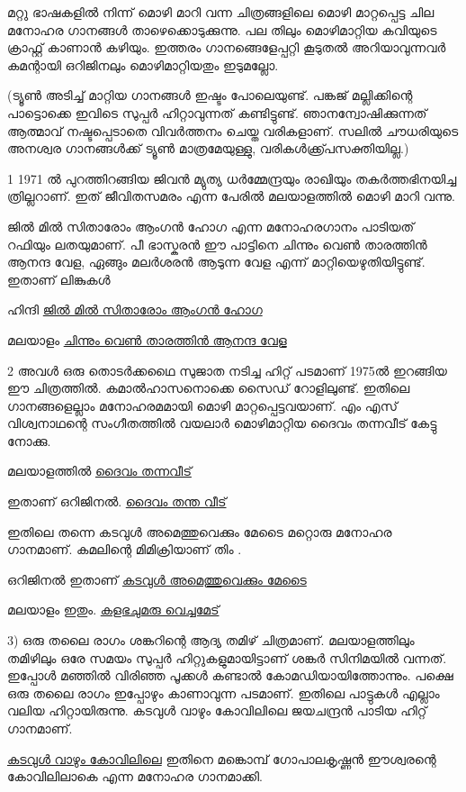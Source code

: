 \documentclass[10pt,a4paper]{report}
\begin{document}
മറ്റു ഭാഷകളിൽ നിന്ന് മൊഴി മാറി വന്ന ചിത്രങ്ങളിലെ മൊഴി മാറ്റപ്പെട്ട ചില മനോഹര ഗാനങ്ങൾ താഴെക്കൊടുക്കുന്നു. പല തിലും മൊഴിമാറ്റിയ കവിയുടെ ക്രാഫ്റ്റ് കാണാൻ കഴിയും. ഇത്തരം ഗാനങ്ങെളേപ്പറ്റി കൂടുതൽ അറിയാവുന്നവർ കമന്റായി ഒറിജിനലും മൊഴിമാറ്റിയതും ഇടുമല്ലോ.

(ട്യൂൺ അടിച്ച് മാറ്റിയ ഗാനങ്ങൾ ഇഷ്ടം പോലെയുണ്ട്. പങ്കജ് മല്ലിക്കിന്റെ പാട്ടൊക്കെ ഇവിടെ സുപ്പർ ഹിറ്റാവുന്നത് കണ്ടിട്ടുണ്ട്. ഞാനന്വോഷിക്കുന്നത് ആത്മാവ് നഷ്ടപ്പെടാതെ വിവർത്തനം ചെയ്ത വരികളാണ്. സലിൽ ചൗധരിയുടെ അനശ്വര ഗാനങ്ങൾക്ക് ട്യൂൺ മാത്രമേയുള്ളു, വരികൾക്ക്പ്രസക്തിയില്ല.)

1 1971 ൽ പുറത്തിറങ്ങിയ ജിവൻ മ്യുത്യ ധർമ്മേന്ദ്രയും രാഖിയും തകർത്തഭിനയിച്ച ത്രില്ലറാണ്. ഇത് ജീവിതസമരം എന്ന പേരിൽ മലയാളത്തിൽ മൊഴി മാറി വന്നു.

ജിൽ മിൽ സിതാരോം ആംഗൻ ഹോഗ എന്ന മനോഹരഗാനം പാടിയത് റഫിയും ലതയുമാണ്. പീ ഭാസ്കരൻ ഈ പാട്ടിനെ ചിന്നും വെൺ താരത്തിൻ ആനന്ദ വേള, ഏങ്ങും മലർശരൻ ആടുന്ന വേള എന്ന് മാറ്റിയെഴുതിയിട്ടുണ്ട്.
ഇതാണ് ലിങ്കുകൾ

ഹിന്ദി
\href{https://youtu.be/uex2GnRrqFU}{ജിൽ മിൽ സിതാരോം ആംഗൻ ഹോഗ }

മലയാളം
\href{https://youtu.be/JfDN6qEHvY8}{ചിന്നും വെൺ താരത്തിൻ ആനന്ദ വേള}

2 അവൾ ഒരു തൊടർക്കഥൈ സുജാത നടിച്ച ഹിറ്റ് പടമാണ് 1975ൽ ഇറങ്ങിയ ഈ ചിത്രത്തിൽ. കമാൽഹാസനൊക്കെ സൈഡ് റോളിലുണ്ട്. ഇതിലെ ഗാനങ്ങളെല്ലാം മനോഹരമമായി മൊഴി മാറ്റപ്പെട്ടവയാണ്.
എം എസ് വിശ്വനാഥന്റെ സംഗീതത്തിൽ വയലാർ മൊഴിമാറ്റിയ ദൈവം തന്നവീട് കേട്ടു നോക്കു.

മലയാളത്തിൽ  \href{https://youtu.be/dxcIZVxxyi4}{ദൈവം തന്നവീട്}

ഇതാണ് ഒറിജിനൽ.
\href{https://youtu.be/5_Zi5ROhjME}{ ദൈവം തന്ത വീട് }

ഇതിലെ തന്നെ കടവുൾ അമെത്തുവെക്കും മേടൈ മറ്റൊരു മനോഹര ഗാനമാണ്.
കമലിന്റെ മിമിക്രിയാണ് തിം .

ഒറിജിനൽ ഇതാണ്
\href{https://youtu.be/gJQ-grJjRgU}{കടവുൾ അമെത്തുവെക്കും മേടൈ}

മലയാളം ഇതും.
\href{https://youtu.be/5v2Yuqiw1Ng}{കളഭചുമരു  വെച്ചമേട് }

3) ഒരു തലൈ രാഗം ശങ്കറിന്റെ ആദ്യ തമിഴ് ചിത്രമാണ്. മലയാളത്തിലും തമിഴിലും ഒരേ സമയം സുപ്പർ ഹിറ്റുകളുമായിട്ടാണ് ശങ്കർ സിനിമയിൽ വന്നത്. ഇപ്പോൾ മഞ്ഞിൽ വിരിഞ്ഞ പൂക്കൾ കണ്ടാൽ കോമഡിയായിത്തോന്നും. പക്ഷെ ഒരു തലൈ രാഗം ഇപ്പോഴും കാണാവുന്ന പടമാണ്. ഇതിലെ പാട്ടുകൾ എല്ലാം വലിയ ഹിറ്റായിരുന്നു.
കടവുൾ വാഴും കോവിലിലെ ജയചന്ദ്രൻ പാടിയ ഹിറ്റ് ഗാനമാണ്.

\href{https://youtu.be/dAGruq3cOUU}{കടവുൾ വാഴും കോവിലിലെ}
ഇതിനെ മങ്കൊമ്പ് ഗോപാലകൃഷ്ണൻ ഈശ്വരന്റെ കോവിലിലാകെ എന്ന മനോഹര ഗാനമാക്കി.
\end{document}
